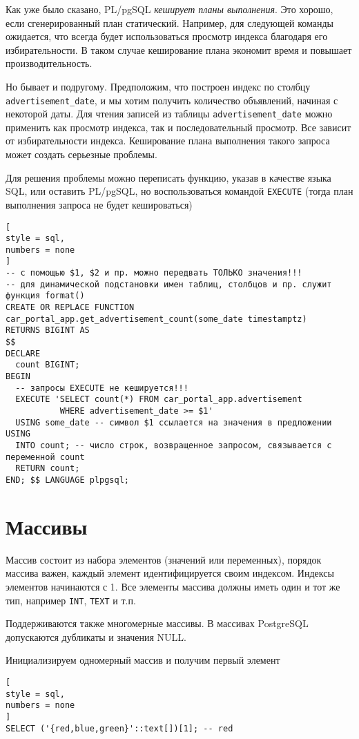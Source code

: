 \documentclass[%
	11pt,
	a4paper,
	utf8,
		]{article}
\begin{document}
Как уже было сказано, PL/pgSQL \emph{кеширует планы выполнения}. Это хорошо, если сгенерированный план статический. Например, для следующей команды ожидается, что всегда будет использоваться просмотр индекса благодаря его избирательности. В таком случае кеширование плана экономит время и повышает производительность.

Но бывает и подругому. Предположим, что построен индекс по столбцу \texttt{advertisement\_date}, и мы хотим получить количество объявлений, начиная с некоторой даты. Для чтения записей из таблицы \texttt{advertisement\_date} можно применить как просмотр индекса, так и последовательный просмотр. Все зависит от избирательности индекса. Кеширование плана выполнения такого запроса может создать серьезные проблемы.

Для решения проблемы можно переписать функцию, указав в качестве языка SQL, или оставить PL/pgSQL, но воспользоваться командой \texttt{EXECUTE} (тогда план выполнения запроса не будет кешироваться)
\begin{lstlisting}[
style = sql,
numbers = none
]
-- с помощью $1, $2 и пр. можно передвать ТОЛЬКО значения!!!
-- для динамической подстановки имен таблиц, столбцов и пр. служит функция format()
CREATE OR REPLACE FUNCTION car_portal_app.get_advertisement_count(some_date timestamptz)
RETURNS BIGINT AS
$$
DECLARE
  count BIGINT;
BEGIN
  -- запросы EXECUTE не кешируется!!!
  EXECUTE 'SELECT count(*) FROM car_portal_app.advertisement
           WHERE advertisement_date >= $1'
  USING some_date -- символ $1 ссылается на значения в предложении USING
  INTO count; -- число строк, возвращенное запросом, связывается с переменной count
  RETURN count;
END; $$ LANGUAGE plpgsql;
\end{lstlisting}

\section{Массивы}

Массив состоит из набора элементов (значений или переменных), порядок массива важен, каждый элемент идентифицируется своим индексом. Индексы элементов начинаются с 1. Все элементы массива должны иметь один и тот же тип, например \texttt{INT}, \texttt{TEXT} и т.п.

Поддерживаются также многомерные массивы. В массивах PostgreSQL допускаются дубликаты и значения NULL.

Инициализируем одномерный массив и получим первый элемент
\begin{lstlisting}[
style = sql,
numbers = none
]
SELECT ('{red,blue,green}'::text[])[1]; -- red
\end{lstlisting}
\end{document}
